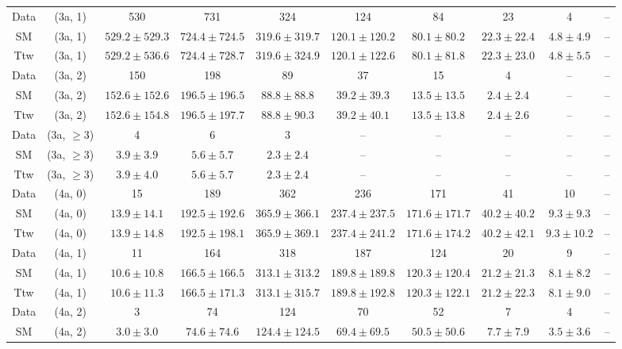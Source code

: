 \begin{table}[h!]
{\begin{tabular}{cccccccccc}
	Data & (3a, 1) & 530 & 731 & 324 & 124 & 84 & 23 & 4 & -- \\[0.5ex] 
	SM & (3a, 1) & $529.2\pm 529.3$ & $724.4\pm 724.5$ & $319.6\pm 319.7$ & $120.1\pm 120.2$ & $80.1\pm 80.2$ & $22.3\pm 22.4$ & $4.8\pm 4.9$ & -- \\[0.5ex] 
	Ttw & (3a, 1) & $529.2\pm 536.6$ & $724.4\pm 728.7$ & $319.6\pm 324.9$ & $120.1\pm 122.6$ & $80.1\pm 81.8$ & $22.3\pm 23.0$ & $4.8\pm 5.5$ & -- \\[0.5ex] 
	Data & (3a, 2) & 150 & 198 & 89 & 37 & 15 & 4 & -- & -- \\[0.5ex] 
	SM & (3a, 2) & $152.6\pm 152.6$ & $196.5\pm 196.5$ & $88.8\pm 88.8$ & $39.2\pm 39.3$ & $13.5\pm 13.5$ & $2.4\pm 2.4$ & -- & -- \\[0.5ex] 
	Ttw & (3a, 2) & $152.6\pm 154.8$ & $196.5\pm 197.7$ & $88.8\pm 90.3$ & $39.2\pm 40.1$ & $13.5\pm 13.8$ & $2.4\pm 2.6$ & -- & -- \\[0.5ex] 
	Data & (3a, $\ge3$) & 4 & 6 & 3 & -- & -- & -- & -- & -- \\[0.5ex] 
	SM & (3a, $\ge3$) & $3.9\pm 3.9$ & $5.6\pm 5.7$ & $2.3\pm 2.4$ & -- & -- & -- & -- & -- \\[0.5ex] 
	Ttw & (3a, $\ge3$) & $3.9\pm 4.0$ & $5.6\pm 5.7$ & $2.3\pm 2.4$ & -- & -- & -- & -- & -- \\[0.5ex] 
	Data & (4a, 0) & 15 & 189 & 362 & 236 & 171 & 41 & 10 & -- \\[0.5ex] 
	SM & (4a, 0) & $13.9\pm 14.1$ & $192.5\pm 192.6$ & $365.9\pm 366.1$ & $237.4\pm 237.5$ & $171.6\pm 171.7$ & $40.2\pm 40.2$ & $9.3\pm 9.3$ & -- \\[0.5ex] 
	Ttw & (4a, 0) & $13.9\pm 14.8$ & $192.5\pm 198.1$ & $365.9\pm 369.1$ & $237.4\pm 241.2$ & $171.6\pm 174.2$ & $40.2\pm 42.1$ & $9.3\pm 10.2$ & -- \\[0.5ex] 
	Data & (4a, 1) & 11 & 164 & 318 & 187 & 124 & 20 & 9 & -- \\[0.5ex] 
	SM & (4a, 1) & $10.6\pm 10.8$ & $166.5\pm 166.5$ & $313.1\pm 313.2$ & $189.8\pm 189.8$ & $120.3\pm 120.4$ & $21.2\pm 21.3$ & $8.1\pm 8.2$ & -- \\[0.5ex] 
	Ttw & (4a, 1) & $10.6\pm 11.3$ & $166.5\pm 171.3$ & $313.1\pm 315.7$ & $189.8\pm 192.8$ & $120.3\pm 122.1$ & $21.2\pm 22.3$ & $8.1\pm 9.0$ & -- \\[0.5ex] 
	Data & (4a, 2) & 3 & 74 & 124 & 70 & 52 & 7 & 4 & -- \\[0.5ex] 
	SM & (4a, 2) & $3.0\pm 3.0$ & $74.6\pm 74.6$ & $124.4\pm 124.5$ & $69.4\pm 69.5$ & $50.5\pm 50.6$ & $7.7\pm 7.9$ & $3.5\pm 3.6$ & -- \\[0.5ex] 

\end{tabular}}
\end{table}
